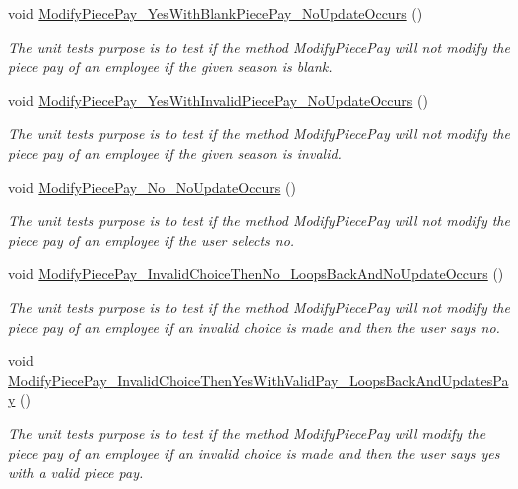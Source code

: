 \begin{DoxyCompactItemize}
void \hyperlink{class_the_company_1_1_tests_1_1_modify_employee_tests_acb166cb90d42f51e2bdf7babe2a73feb}{Modify\+Piece\+Pay\+\_\+\+Yes\+With\+Blank\+Piece\+Pay\+\_\+\+No\+Update\+Occurs} ()
\begin{DoxyCompactList}\small\item\em The unit test\textquotesingle{}s purpose is to test if the method Modify\+Piece\+Pay will not modify the piece pay of an employee if the given season is blank. \end{DoxyCompactList}\item 
void \hyperlink{class_the_company_1_1_tests_1_1_modify_employee_tests_a49fd49e5f38010edfb98bc59fc48174f}{Modify\+Piece\+Pay\+\_\+\+Yes\+With\+Invalid\+Piece\+Pay\+\_\+\+No\+Update\+Occurs} ()
\begin{DoxyCompactList}\small\item\em The unit test\textquotesingle{}s purpose is to test if the method Modify\+Piece\+Pay will not modify the piece pay of an employee if the given season is invalid. \end{DoxyCompactList}\item 
void \hyperlink{class_the_company_1_1_tests_1_1_modify_employee_tests_ac1bf6c9c16cbd84497bc9c10615cec9b}{Modify\+Piece\+Pay\+\_\+\+No\+\_\+\+No\+Update\+Occurs} ()
\begin{DoxyCompactList}\small\item\em The unit test\textquotesingle{}s purpose is to test if the method Modify\+Piece\+Pay will not modify the piece pay of an employee if the user selects no. \end{DoxyCompactList}\item 
void \hyperlink{class_the_company_1_1_tests_1_1_modify_employee_tests_aecc8a32b33f6ac358f2c45c4da92c52b}{Modify\+Piece\+Pay\+\_\+\+Invalid\+Choice\+Then\+No\+\_\+\+Loops\+Back\+And\+No\+Update\+Occurs} ()
\begin{DoxyCompactList}\small\item\em The unit test\textquotesingle{}s purpose is to test if the method Modify\+Piece\+Pay will not modify the piece pay of an employee if an invalid choice is made and then the user says no. \end{DoxyCompactList}\item 
void \hyperlink{class_the_company_1_1_tests_1_1_modify_employee_tests_a5990ec487b222e1e04c9f3cfd363f5ed}{Modify\+Piece\+Pay\+\_\+\+Invalid\+Choice\+Then\+Yes\+With\+Valid\+Pay\+\_\+\+Loops\+Back\+And\+Updates\+Pay} ()
\begin{DoxyCompactList}\small\item\em The unit test\textquotesingle{}s purpose is to test if the method Modify\+Piece\+Pay will modify the piece pay of an employee if an invalid choice is made and then the user says yes with a valid piece pay. \end{DoxyCompactList}\item 

\end{DoxyCompactItemize}

